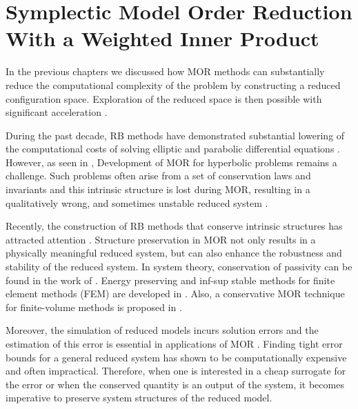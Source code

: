 \chapter{Symplectic Model Order Reduction With a Weighted Inner Product} \label{chapter:5}

In the previous chapters we discussed how MOR methods can substantially reduce the computational complexity of the problem by constructing a reduced configuration space. Exploration of the reduced space is then possible with significant acceleration \cite{hesthaven2015certified,Haasdonk2017}.

During the past decade, RB methods have demonstrated substantial lowering of the computational costs of solving elliptic and parabolic differential equations \cite{ito1998reduced,ito2001reduced}. However, as seen in , Development of MOR for hyperbolic problems remains a challenge. Such problems often arise from a set of conservation laws and invariants and this intrinsic structure is lost during MOR, resulting in a qualitatively wrong, and sometimes unstable reduced system \cite{Amsallem:2014ef}.

Recently, the construction of RB methods that conserve intrinsic structures has attracted attention \cite{doi:10.1137/17M1111991,kalashnikova2014stabilization,farhat2015structure,doi:10.1137/110836742,doi:10.1137/140959602,beattie2011structure,doi:10.1137/140978922}. Structure preservation in MOR not only results in a physically meaningful reduced system, but can also enhance the robustness and stability of the reduced system. In system theory, conservation of passivity can be found in the work of \cite{polyuga2010structure,gugercin2012structure}. Energy preserving and inf-sup stable methods for finite element methods (FEM) are developed in \cite{farhat2015structure,ballarin2015supremizer}. Also, a conservative MOR technique for finite-volume methods is proposed in \cite{carlberg2018conservative}.

Moreover, the simulation of reduced models incurs solution errors and the estimation of this error is essential in applications of MOR \cite{HaasdonkOhlberger11,RuinerEtAl12,BhattEtAl18}. Finding tight error bounds for a general reduced system has shown to be computationally expensive and often impractical. Therefore, when one is interested in a cheap surrogate for the error or when the conserved quantity is an output of the system, it becomes imperative to preserve system structures of the reduced model.

